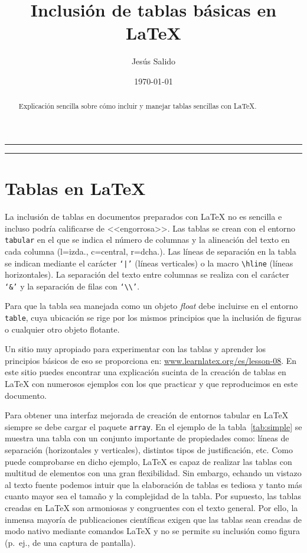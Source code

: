\documentclass[11pt,a4paper]{article}
\author{Jesús Salido}
\title{Inclusión de tablas básicas en \LaTeX{}}
\date{\today}
\begin{document}
\maketitle
\begin{abstract}
	Explicación sencilla sobre cómo incluir y manejar tablas sencillas con \LaTeX{}.
\end{abstract}

\hrule
\tableofcontents
\listoftables
\bigskip
\hrule




\section{Tablas en \LaTeX{}}
La inclusión de tablas en documentos preparados con \LaTeX{} no es sencilla e incluso podría calificarse de <<engorrosa>>. Las tablas se crean con el entorno \texttt{tabular} en el que se indica el número de columnas y la alineación del texto en cada columna (l=izda., c=central, r=dcha.). Las líneas de separación en la tabla se indican mediante el carácter \texttt{`|'} (líneas verticales) o la macro \texttt{\textbackslash hline} (líneas horizontales). La separación del texto entre columnas se realiza con el carácter \texttt{`\&'} y la separación de filas con \texttt{`\textbackslash\textbackslash'}.

Para que la tabla sea manejada como un objeto \emph{float} debe incluirse en el entorno \texttt{table}, cuya ubicación se rige por los mismos principios que la inclusión de figuras o cualquier otro objeto flotante.

Un sitio muy apropiado para experimentar con las tablas y aprender los principios básicos de eso se proporciona en: \url{www.learnlatex.org/es/lesson-08}. En este sitio puedes encontrar una explicación sucinta de la creación de tablas en \LaTeX{} con numerosos ejemplos con los que practicar y que reproducimos en este documento.

Para obtener una interfaz mejorada de creación de entornos tabular en \LaTeX{} siempre se debe cargar el paquete \texttt{array}. En el ejemplo de la tabla~\ref{tab:simple} se muestra una tabla con un conjunto importante de propiedades como: líneas de separación (horizontales y verticales), distintos tipos de justificación, etc. Como puede comprobarse en dicho ejemplo, \LaTeX{} es capaz de realizar las tablas con multitud de elementos con una gran flexibilidad. Sin embargo, echando un vistazo al texto fuente podemos intuir que la elaboración de tablas es tediosa y tanto más cuanto mayor sea el tamaño y la complejidad de la tabla. Por supuesto, las tablas creadas en \LaTeX{} son armoniosas y congruentes con el texto general. Por ello, la inmensa mayoría de publicaciones científicas exigen que las tablas sean creadas de modo nativo mediante comandos \LaTeX{} y no se permite su inclusión como figura (p.~ej., de una captura de pantalla).
\end{document}
